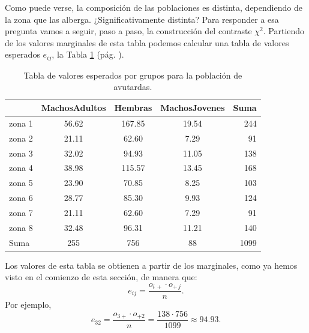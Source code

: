 \begin{Ejemplo}
Como puede verse, la composición de las poblaciones es distinta, dependiendo de la zona que las
alberga. ¿Significativamente distinta? Para responder a esa pregunta vamos a seguir, paso a paso,
la construcción del contraste $\chi^2$. Partiendo de los valores marginales de esta tabla podemos
calcular una tabla de valores esperados $e_{ij}$, la Tabla
\ref{cap13:Tabla:AvutardasValoresEsperados} (pág. \pageref{cap13:Tabla:AvutardasValoresEsperados}).

    \begin{table}[h]
    \centering
    \begin{tabular}{lccc|r}
        \hline
        & MachosAdultos & Hembras & MachosJovenes & Suma \\
        \hline
        zona 1 & 56.62 & 167.85 & 19.54 & 244 \\
        zona 2 & 21.11 & 62.60 & 7.29 & 91 \\
        zona 3 & 32.02 & 94.93 & 11.05 & 138 \\
        zona 4 & 38.98 & 115.57 & 13.45 & 168 \\
        zona 5 & 23.90 & 70.85 & 8.25 & 103 \\
        zona 6 & 28.77 & 85.30 & 9.93 & 124 \\
        zona 7 & 21.11 & 62.60 & 7.29 & 91 \\
        zona 8 & 32.48 & 96.31 & 11.21 & 140 \\
        \hline
        Suma & 255 & 756 & 88 & 1099 \\
        \hline
    \end{tabular}
    \caption{Tabla de valores esperados por grupos para la población de avutardas.}\label{cap13:Tabla:AvutardasValoresEsperados}
    \end{table}
    Los valores de esta tabla se obtienen a partir de los marginales, como ya hemos visto en el comienzo de esta sección, de manera que:
    \[e_{ij}=\dfrac{o_{i\,+}\cdot o_{+\,j}}{n}.\]
    Por ejemplo,
    \[e_{32}=\dfrac{o_{3+}\cdot o_{+ 2}}{n}=\dfrac{138\cdot 756}{1099}\approx 94.93.\]


\end{Ejemplo}
